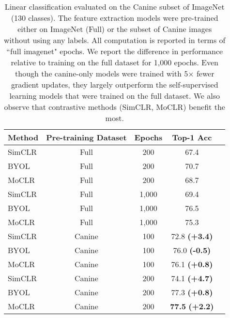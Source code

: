 \documentclass[final]{cvpr}
\newcommand\showdiff[1]{\textbf{\textcolor{nicergreen}{#1}}}
\newcommand\baseline{MoCLR}
\begin{document}
\begin{table}[t]
\caption{Linear classification evaluated on the Canine subset of ImageNet (130 classes). The feature extraction models were pre-trained either on ImageNet (Full) or the subset of Canine images without using any labels. All computation is reported in terms of ``full imagenet" epochs. We report the difference in performance relative to training on the full dataset for 1,000 epochs. Even though the canine-only models were trained with 5$\times$ fewer gradient updates, they largely outperform the self-supervised learning models that were trained on the full dataset. We also observe that contrastive methods (SimCLR, \baseline{}) benefit the most.}
\vspace{-4pt}
\label{tab:canine_results}
\begin{center}
\begin{small}
\begin{tabular}{lcccc}
\toprule
Method & Pre-training Dataset & Epochs  & Top-1 Acc \\
\midrule 
SimCLR & Full & \hspace{0.5em} 200  & 67.4  \\
BYOL & Full & \hspace{0.5em} 200  & 70.7  \\
\baseline{} & Full & \hspace{0.5em} 200  & 68.7  \\ 
\midrule 
SimCLR & Full & 1,000 & 69.4 \\
BYOL & Full & 1,000 & 76.5  \\
\baseline{} & Full & 1,000 & 75.3   \\ 
\midrule 
SimCLR & Canine & \hspace{0.25em} 100 & 72.8 \showdiff{(+3.4)}  \\
BYOL & Canine & \hspace{0.25em} 100 & 76.0 \textbf{(-0.5)}  \\
\baseline{} & Canine & \hspace{0.25em} 100  & 76.1 \showdiff{(+0.8)}  \\
\midrule 
SimCLR & Canine & \hspace{0.5em}  200 & 74.1 \showdiff{(+4.7)}  \\
BYOL & Canine & \hspace{0.5em} 200 & 77.3 \showdiff{(+0.8)}  \\
\baseline{} & Canine & \hspace{0.5em} 200 & \textbf{77.5} \showdiff{(+2.2)} \\
\bottomrule
\end{tabular}
\end{small}
\end{center}
\vspace{-10pt}
\end{table}
\end{document}
